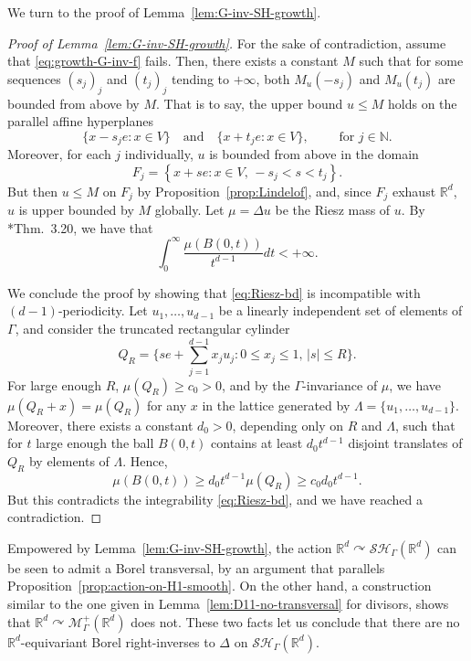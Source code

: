 \documentclass[12pt]{paper}
\numberwithin{equation}{section}
\theoremstyle{plain}
\theoremstyle{definition}
\newcommand{\N}{\mathbb{N}}
\newcommand{\Rd}{\mathbb{R}^{d}}
\newcommand{\measp}[2][]{\mathcal{M}_{#1}^+(#2)}
\newcommand{\sharm}[2][]{\mathcal{SH}_{#1}(#2)}
\newcommand{\acts}{\curvearrowright}
\begin{document}
We turn to the proof of Lemma~\ref{lem:G-inv-SH-growth}.

\begin{proof}[Proof of Lemma~\ref{lem:G-inv-SH-growth}]
  For the sake of contradiction, assume that \eqref{eq:growth-G-inv-f} fails.  Then, there exists a
  constant \(M\) such that for some sequences \((s_j)_j\) and \((t_{j})_{j}\) tending to
  \(+\infty\), both \(M_{u}(-s_j)\) and \(M_{u}(t_j)\) are bounded from above by \(M\).  That is to
  say, the upper bound \(u\le M\) holds on the parallel affine hyperplanes
  \[
    \{x-s_je: x\in V\}\quad\text{and}\quad \{x+t_je: x\in V\}, \qquad \textrm{ for } j \in \N.
  \]
  Moreover, for each \(j\) individually, \(u\) is bounded from above in the domain
  \[
    F_j=\left\{x+se: x\in V,\, -s_j<s<t_j\right\}.
  \]
  But then \(u\le M\) on \(F_j\) by Proposition~\ref{prop:Lindelof}, and, since \(F_j\) exhaust
  \(\Rd\), \(u\) is upper bounded by \(M\) globally.  Let \(\mu=\Delta u\) be the Riesz mass of
  \(u\). By \cite{haymanSubharmonicFunctionsVol1976}*{Thm.~3.20}, we have that
  \begin{equation}
    \label{eq:Riesz-bd}
    \int_0^\infty \frac{\mu(B(0,t))}{t^{d-1}} dt<+\infty.
  \end{equation}

  We conclude the proof by showing that \eqref{eq:Riesz-bd} is incompatible with
  \((d-1)\)-periodicity.  Let \(u_1,\ldots,u_{d-1}\) be a linearly independent set of elements of
  \(\Gamma\), and consider the truncated rectangular cylinder
  \[
    Q_R=\biggl\{se+\sum_{j=1}^{d-1}x_ju_j:0\le x_j\le 1,\, |s|\le R\biggr\}.
  \]
  For large enough \(R\), \(\mu(Q_R)\ge c_0>0\), and by the \(\Gamma\)-invariance of \(\mu\), we
  have \(\mu(Q_R + x)=\mu(Q_R)\) for any \(x\) in the lattice generated by
  \(\Lambda=\{u_1,\ldots,u_{d-1}\}\).  Moreover, there exists a constant \(d_0>0\), depending only
  on \(R\) and \(\Lambda\), such that for \(t\) large enough the ball \(B(0,t)\) contains at least
  \(d_0 t^{d-1}\) disjoint translates of \(Q_R\) by elements of \(\Lambda\). Hence,
  \[
  \mu(B(0,t))\ge d_0t^{d-1}\mu(Q_R)\ge c_0d_0 t^{d-1}.
  \]
  But this contradicts the integrability \eqref{eq:Riesz-bd}, and we have reached a contradiction.
\end{proof}


Empowered by Lemma~\ref{lem:G-inv-SH-growth}, the action \(\Rd \acts \sharm[\Gamma]{\Rd}\) can be
seen to admit a Borel transversal, by an argument that parallels
Proposition~\ref{prop:action-on-H1-smooth}.  On the other hand, a construction similar to the one
given in Lemma~\ref{lem:D11-no-transversal} for divisors, shows that
\(\Rd \acts \measp[\Gamma]{\Rd}\) does not.  These two facts let us conclude that there are no
\(\Rd\)-equivariant Borel right-inverses to \(\Delta\) on \(\sharm[\Gamma]{\Rd}\).
\end{document}
